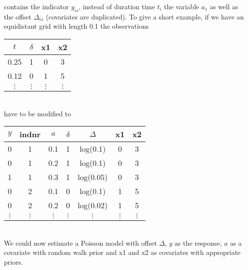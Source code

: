 contains the indicator $y_{is}$, instead of duration time $t_i$
the variable $a_s$ as well as the offset $\Delta_{is}$ (covariates
are duplicated). To give a short example, if we have an
equidistant grid with length 0.1 the observations
\vspace{0.5cm}\\
\begin{tabular}{c|c|c|c}
  $t$ &   $\delta$ &  x1 &  x2\\\hline\hline
0.25  &  1  &    0  &  3\\\hline 0.12  &  0  &    1  &  5\\\hline
$\vdots$ & $\vdots$ & $\vdots$ & $\vdots$ \\
\end{tabular}
\vspace{0.5cm}\\
have to be modified to
\vspace{0.5cm}\\
\begin{tabular}{c|c|c|c|c|c|c}
$y$ & indnr & $a$& $\delta$ &  $\Delta$ &   x1 & x2\\\hline\hline
0 &  1 &   0.1 &   1  &  log(0.1) & 0  & 3\\
0  & 1   & 0.2  &  1  &  log(0.1) & 0 &  3\\
1  & 1   & 0.3  &  1  &  log(0.05)& 0  & 3\\\hline
0 &  2 &   0.1 &   0 &   log(0.1) & 1 &  5\\
0  & 2  &  0.2 &   0  &  log(0.02)& 1 &  5\\\hline
$\vdots$ & $\vdots$ & $\vdots$ & $\vdots$ & $\vdots$ & $\vdots$& $\vdots$\\
\end{tabular}
\vspace{0.5cm}\\
We could now estimate a Poisson model with offset $\Delta$, $y$ as
the response, $a$ as a covariate with random walk prior and x1 and
x2 as covariates with appropriate priors.


